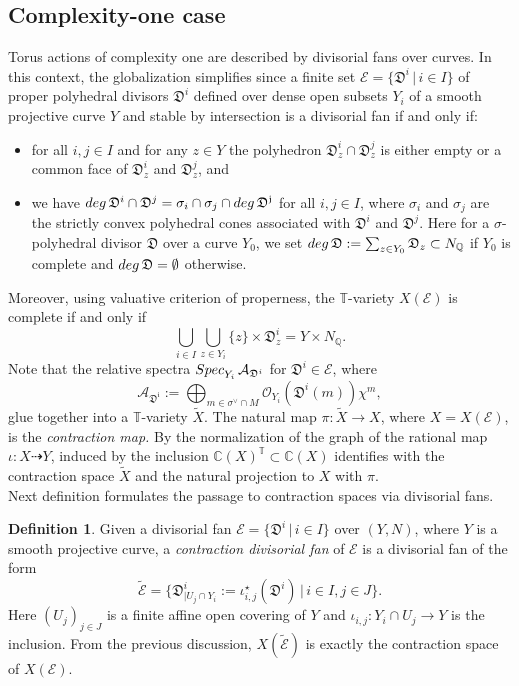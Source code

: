 \documentclass[11pt, reqno]{amsart}
\theoremstyle{plain}
\theoremstyle{definition}
\newtheorem{definition}[theorem]{Definition}
\theoremstyle{remark}
\begin{document}
\subsection{Complexity-one case}
Torus actions of complexity one are described by divisorial fans over curves. In this context, the globalization  simplifies since a finite set  $\mathscr{E} =  \{\mathfrak{D}^{i}\,|\, i\in I\}$ of proper polyhedral divisors $\mathfrak{D}^{i}$ defined over dense open subsets $Y_{i}$ of  a smooth projective curve $Y$ and  stable by intersection is a divisorial fan if and only if:
\begin{itemize}
\item[(1)] for all $i,j\in I$ and for any $z\in Y$ the polyhedron $\mathfrak{D}_{z}^{i}\cap \mathfrak{D}_{z}^{j}$
is either empty or a common face of $\mathfrak{D}_{z}^{i}$ and $\mathfrak{D}^{j}_{z}$, and
\item[(2)] we have ${\rm deg}\, \mathfrak{D}^{i}\cap \mathfrak{D}^{j} =  \sigma_{i}\cap \sigma_{j}\cap {\rm deg}\,\mathfrak{D^{j}}$ for all $i,j\in I$, where $\sigma_{i}$ and $\sigma_{j}$ are the strictly convex polyhedral cones associated with
$\mathfrak{D}^{i}$ and $\mathfrak{D}^{j}$. Here for a $\sigma$-polyhedral divisor $\mathfrak{D}$ over a curve $Y_{0}$, we set ${\rm deg}\, \mathfrak{D} := \sum_{z\in Y_{0}}\mathfrak{D}_{z}\subset N_{\mathbb{Q}}$ if $Y_{0}$ is complete and ${\rm deg}\, \mathfrak{D} =  \emptyset$ otherwise.
\end{itemize}
Moreover, using valuative criterion of properness, the $\mathbb{T}$-variety $X(\mathscr{E})$ is complete
if and only if 
$$ \bigcup_{i\in I}\bigcup_{z\in Y_{i}}\{z\}\times \mathfrak{D}_{z}^{i}  =  Y\times N_{\mathbb{Q}}.$$
Note that the  relative spectra ${\rm Spec}_{Y_{i}}\, \mathcal{A}_{\mathfrak{D}^{i}}$ for $\mathfrak{D}^{i}\in \mathscr{E}$, 
where 
$$\mathcal{A}_{\mathfrak{D^{i}}}:=  \bigoplus_{m\in \sigma^{\vee}\cap M}\mathcal{O}_{Y_{i}}(\mathfrak{D}^{i}(m))\chi^{m},$$
 glue together into a $\mathbb{T}$-variety $\widetilde{X}$. The natural map $\pi: \widetilde{X}\rightarrow X$, where $X  =  X(\mathscr{E})$, is the \emph{contraction map.} By \cite[Section 3, Lemma 1]{Vol10} the normalization of the graph of the rational map $\iota: X\dashrightarrow Y$, induced by the inclusion $\mathbb{C}(X)^{\mathbb{T}}\subset \mathbb{C}(X)$ identifies with the contraction space $\widetilde{X}$ and the natural projection to $X$ with $\pi$.
\\

Next definition formulates the passage to contraction spaces via divisorial fans.
\begin{definition}\label{def-contrat-theta5758}
Given a divisorial fan $\mathscr{E} =  \{\mathfrak{D}^{i}\,|\, i\in I\}$ over $(Y, N)$, where $Y$ is a smooth projective curve, 
a \emph{contraction divisorial fan} of $\mathscr{E}$ is a divisorial fan of the form
$$\widetilde{\mathscr{E}} =  \{\mathfrak{D}^{i}_{| U_{j}\cap Y_{i}} :=  \iota_{i,j}^{\star}(\mathfrak{D}^{i})\,|\, i\in I, j\in J\}.$$
Here $(U_{j})_{j\in J}$ is a finite affine open covering of $Y$ and $\iota_{i, j}: Y_{i}\cap U_{j}\rightarrow Y$ is the inclusion. From the 
previous discussion, $X(\widetilde{\mathscr{E}})$ is exactly the contraction space of $X(\mathscr{E})$. 
\end{definition}
\end{document}

